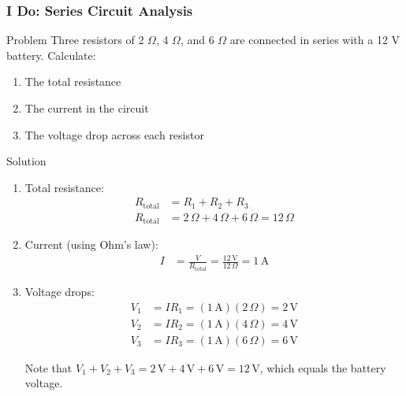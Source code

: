 \documentclass{beamer}
\begin{document}
\begin{frame}
    \frametitle{I Do: Series Circuit Analysis}
    \begin{block}{Problem}
        Three resistors of 2 $\Omega$, 4 $\Omega$, and 6 $\Omega$ are connected in series with a 12 V battery. Calculate:
        \begin{enumerate}
            \item The total resistance
            \item The current in the circuit
            \item The voltage drop across each resistor
        \end{enumerate}
    \end{block}
    \end{frame}

\begin{frame}
    \begin{block}{Solution}
        \begin{enumerate}
            \item Total resistance:
            \begin{align}
                R_{\text{total}} &= R_1 + R_2 + R_3 \\
                R_{\text{total}} &= 2\,\Omega + 4\,\Omega + 6\,\Omega = 12\,\Omega
            \end{align}
            
            \item Current (using Ohm's law):
            \begin{align}
                I &= \frac{V}{R_{\text{total}}} = \frac{12\,\text{V}}{12\,\Omega} = 1\,\text{A}
            \end{align}
            
            \item Voltage drops:
            \begin{align}
                V_1 &= IR_1 = (1\,\text{A})(2\,\Omega) = 2\,\text{V} \\
                V_2 &= IR_2 = (1\,\text{A})(4\,\Omega) = 4\,\text{V} \\
                V_3 &= IR_3 = (1\,\text{A})(6\,\Omega) = 6\,\text{V}
            \end{align}
            
            Note that $V_1 + V_2 + V_3 = 2\,\text{V} + 4\,\text{V} + 6\,\text{V} = 12\,\text{V}$, which equals the battery voltage.
        \end{enumerate}
    \end{block}
\end{frame}
\end{document}
